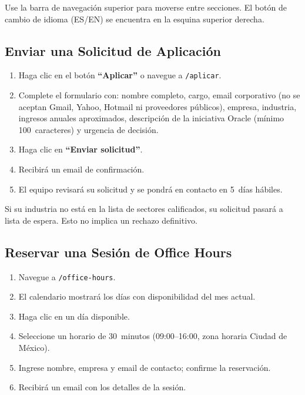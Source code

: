 \documentclass[12pt, a4paper, twoside]{report}
\begin{document}
Use la barra de navegación superior para moverse entre secciones. El botón de cambio de
idioma (ES/EN) se encuentra en la esquina superior derecha.

\subsection{Enviar una Solicitud de Aplicación}

\begin{enumerate}
  \item Haga clic en el botón \textbf{``Aplicar''} o navegue a \texttt{/aplicar}.
  \item Complete el formulario con: nombre completo, cargo, email corporativo (no se aceptan
        Gmail, Yahoo, Hotmail ni proveedores públicos), empresa, industria, ingresos anuales
        aproximados, descripción de la iniciativa Oracle (mínimo 100~caracteres) y urgencia
        de decisión.
  \item Haga clic en \textbf{``Enviar solicitud''}.
  \item Recibirá un email de confirmación.
  \item El equipo revisará su solicitud y se pondrá en contacto en 5~días hábiles.
\end{enumerate}

\begin{tcolorbox}[notebox]
  Si su industria no está en la lista de sectores calificados, su solicitud pasará a lista
  de espera. Esto no implica un rechazo definitivo.
\end{tcolorbox}

\subsection{Reservar una Sesión de Office Hours}

\begin{enumerate}
  \item Navegue a \texttt{/office-hours}.
  \item El calendario mostrará los días con disponibilidad del mes actual.
  \item Haga clic en un día disponible.
  \item Seleccione un horario de 30~minutos (09:00--16:00, zona horaria Ciudad de México).
  \item Ingrese nombre, empresa y email de contacto; confirme la reservación.
  \item Recibirá un email con los detalles de la sesión.
\end{enumerate}
\end{document}
